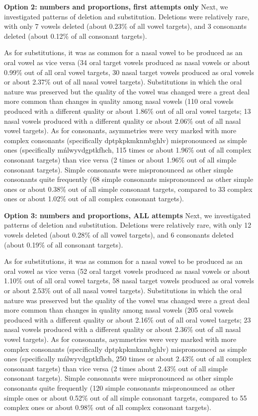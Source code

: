 \documentclass[english,,man,floatsintext]{apa6}
\begin{document}
\textbf{Option 2: numbers and proportions, first attempts only} Next, we
investigated patterns of deletion and substitution. Deletions were
relatively rare, with only 7 vowels deleted (about 0.23\% of all vowel
targets), and 3 consonants deleted (about 0.12\% of all consonant
targets).

As for substitutions, it was as common for a nasal vowel to be produced
as an oral vowel as vice versa (34 oral target vowels produced as nasal
vowels or about 0.99\% out of all oral vowel targets, 30 nasal target
vowels produced as oral vowels or about 2.37\% out of all nasal vowel
targets). Substitutions in which the oral nature was preserved but the
quality of the vowel was changed were a great deal more common than
changes in quality among nasal vowels (110 oral vowels produced with a
different quality or about 1.86\% out of all oral vowel targets; 13
nasal vowels produced with a different quality or about 2.06\% out of
all nasal vowel targets). As for consonants, asymmetries were very
marked with more complex consonants (specifically dptpkpkmknmbghlv)
mispronounced as simple ones (specifically mńlwyvdgptkfhch, 115 times or
about 1.96\% out of all complex consonant targets) than vice versa (2
times or about 1.96\% out of all simple consonant targets). Simple
consonants were mispronounced as other simple consonants quite
frequently (68 simple consonants mispronounced as other simple ones or
about 0.38\% out of all simple consonant targets, compared to 33 complex
ones or about 1.02\% out of all complex consonant targets).

\textbf{Option 3: numbers and proportions, ALL attempts} Next, we
investigated patterns of deletion and substitution. Deletions were
relatively rare, with only 12 vowels deleted (about 0.28\% of all vowel
targets), and 6 consonants deleted (about 0.19\% of all consonant
targets).

As for substitutions, it was as common for a nasal vowel to be produced
as an oral vowel as vice versa (52 oral target vowels produced as nasal
vowels or about 1.10\% out of all oral vowel targets, 58 nasal target
vowels produced as oral vowels or about 2.53\% out of all nasal vowel
targets). Substitutions in which the oral nature was preserved but the
quality of the vowel was changed were a great deal more common than
changes in quality among nasal vowels (205 oral vowels produced with a
different quality or about 2.16\% out of all oral vowel targets; 23
nasal vowels produced with a different quality or about 2.36\% out of
all nasal vowel targets). As for consonants, asymmetries were very
marked with more complex consonants (specifically dptpkpkmknmbghlv)
mispronounced as simple ones (specifically mńlwyvdgptkfhch, 250 times or
about 2.43\% out of all complex consonant targets) than vice versa (2
times about 2.43\% out of all simple consonant targets). Simple
consonants were mispronounced as other simple consonants quite
frequently (120 simple consonants mispronounced as other simple ones or
about 0.52\% out of all simple consonant targets, compared to 55 complex
ones or about 0.98\% out of all complex consonant targets).
\end{document}
